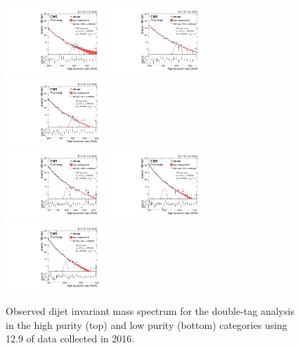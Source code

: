 \begin{figure}[h!]
\centering
\includegraphics[width=0.327\textwidth]{figures/analysis/search2/B2G-16-021/figures/mjj/MLBkgFit_DijetMassHighPuriWW.pdf}
\includegraphics[width=0.327\textwidth]{figures/analysis/search2/B2G-16-021/figures/mjj/MLBkgFit_DijetMassHighPuriWZ.pdf}
\includegraphics[width=0.327\textwidth]{figures/analysis/search2/B2G-16-021/figures/mjj/MLBkgFit_DijetMassHighPuriZZ.pdf}\\
\includegraphics[width=0.327\textwidth]{figures/analysis/search2/B2G-16-021/figures/mjj/MLBkgFit_DijetMassLowPuriWW.pdf}
\includegraphics[width=0.327\textwidth]{figures/analysis/search2/B2G-16-021/figures/mjj/MLBkgFit_DijetMassLowPuriWZ.pdf}
\includegraphics[width=0.327\textwidth]{figures/analysis/search2/B2G-16-021/figures/mjj/MLBkgFit_DijetMassLowPuriZZ.pdf}
\caption{Observed dijet invariant mass spectrum for the double-tag analysis in the high purity (top) and low purity (bottom) categories using 12.9 \fbinv of data collected in 2016.}
\label{fig:searchII:doubleobsmvv}
\end{figure}
